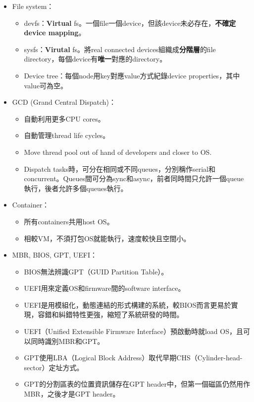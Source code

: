\begin{itemize}
\begin{itemize}
    \end{itemize}
    \item File system： \begin{itemize}
        \item devfs：\textbf{Virtual} fs。一個file一個device，但該device未必存在，\textbf{不確定device mapping}。
        \item sysfs：\textbf{Virutal} fs。將real connected devices組織成\textbf{分階層}的file directory，每個device有\textbf{唯一}對應的directory。
        \item Device tree：每個node用key對應value方式紀錄device properties，其中value可為空。
    \end{itemize}
    \item GCD (Grand Central Dispatch)： \begin{itemize}
        \item 自動利用更多CPU cores。
        \item 自動管理thread life cycles。
        \item Move thread pool out of hand of developers and closer to OS.
        \item Dispatch tasks時，可分在相同或不同queues，分別稱作serial和concurrent。Queues間可分為sync和async，前者同時間只允許一個queue執行，後者允許多個queues執行。
    \end{itemize}
    \item Container： \begin{itemize}
        \item 所有containers共用host OS。
        \item 相較VM，不須打包OS就能執行，速度較快且空間小。
    \end{itemize}
    \item MBR, BIOS, GPT, UEFI： \begin{itemize}
        \item BIOS無法辨識GPT（GUID Partition Table）。
        \item UEFI用來定義OS和firmware間的software interface。
        \item UEFI是用模組化，動態連結的形式構建的系統，較BIOS而言更易於實現，容錯和糾錯特性更強，縮短了系統研發的時間。
        \item UEFI（Unified Extensible Firmware Interface）預啟動時就load OS，且可以同時識別MBR和GPT。
        \item GPT使用LBA（Logical Block Address）取代早期CHS（Cylinder-head-sector）定址方式。
        \item GPT的分割區表的位置資訊儲存在GPT header中，但第一個磁區仍然用作MBR，之後才是GPT header。

\end{itemize}
\end{itemize}
